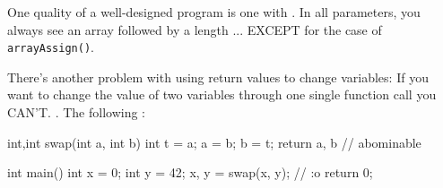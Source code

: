 One quality of a well-designed program is one with . In all parameters, you always see an array followed by a length ... EXCEPT for the case of \texttt{arrayAssign()}.

There's another problem with using return values to change variables: If you want to change the value of two variables through one single function call you CAN'T. . The following :

\begin{consolethree}[escapeinside=||]
int,int swap(int a, int b)
{
    int t = a;
    a = b;
    b = t;
    return a, b // abominable
}

int main()
{
    int x = 0;
    int y = 42;
    x, y = swap(x, y); // :o
    return 0;
}
\end{consolethree}


